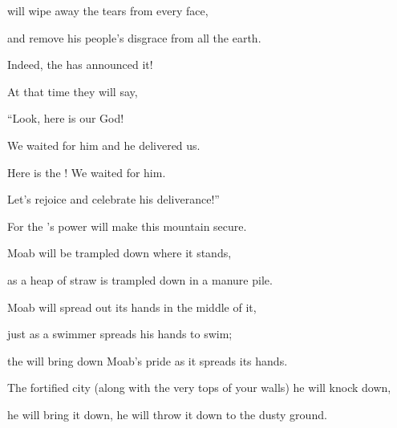 {{}
will wipe away
the tears
from every
face,
\par }{\Q and remove
his people’s
disgrace
from all
the earth.
\par }{\Q Indeed,
the {}
has announced it!
\par }{\Q {}At that time
they will say,
\par }{\Q “Look,
here
is our God!
\par }{\Q We waited
for him and he delivered
us.
\par }{\Q Here
is the
{}! We waited
for him.
\par }{\Q Let’s
rejoice
and celebrate his deliverance!”
\par }{\Q {}For
the
{}’s
power
will make this
mountain
secure.
\par }{\Q Moab
will be trampled
down where it stands,
\par }{\Q as a heap of straw
is trampled
down in a manure pile.
\par }{\Q {}Moab will spread
out its hands
in the middle
of it,

\par }{\Q just as
a swimmer
spreads
his hands to swim;
\par }{\Q the
{} will bring down
Moab’s pride
as it spreads
its hands.
\par }{\Q {}The fortified city
(along with the very tops
of your walls) he will knock down,
\par }{\Q he will bring
it down,
he will throw
it down
to
the dusty
ground.

}
